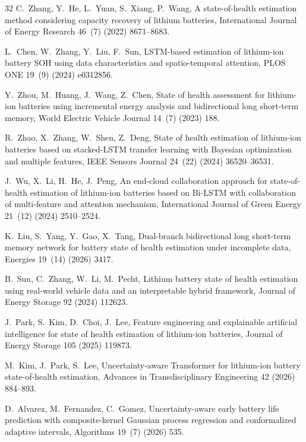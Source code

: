 \documentclass[a4paper,fleqn]{cas-sc}
\begin{document}
\begin{thebibliography}{32}
C.~Zhang, Y.~He, L.~Yuan, S.~Xiang, P.~Wang, A state-of-health estimation method considering capacity recovery of lithium batteries, International Journal of Energy Research 46~(7) (2022) 8671--8683.

L.~Chen, W.~Zhang, Y.~Liu, F.~Sun, LSTM-based estimation of lithium-ion battery SOH using data characteristics and spatio-temporal attention, PLOS ONE 19~(9) (2024) e0312856.

Y.~Zhou, M.~Huang, J.~Wang, Z.~Chen, State of health assessment for lithium-ion batteries using incremental energy analysis and bidirectional long short-term memory, World Electric Vehicle Journal 14~(7) (2023) 188.

R.~Zhao, X.~Zhang, W.~Shen, Z.~Deng, State of health estimation of lithium-ion batteries based on stacked-LSTM transfer learning with Bayesian optimization and multiple features, IEEE Sensors Journal 24~(22) (2024) 36520--36531.

J.~Wu, X.~Li, H.~He, J.~Peng, An end-cloud collaboration approach for state-of-health estimation of lithium-ion batteries based on Bi-LSTM with collaboration of multi-feature and attention mechanism, International Journal of Green Energy 21~(12) (2024) 2510--2524.

K.~Liu, S.~Yang, Y.~Gao, X.~Tang, Dual-branch bidirectional long short-term memory network for battery state of health estimation under incomplete data, Energies 19~(14) (2026) 3417.

B.~Sun, C.~Zhang, W.~Li, M.~Pecht, Lithium battery state of health estimation using real-world vehicle data and an interpretable hybrid framework, Journal of Energy Storage 92 (2024) 112623.

J.~Park, S.~Kim, D.~Choi, J.~Lee, Feature engineering and explainable artificial intelligence for state of health estimation of lithium-ion batteries, Journal of Energy Storage 105 (2025) 119873.

M.~Kim, J.~Park, S.~Lee, Uncertainty-aware Transformer for lithium-ion battery state-of-health estimation, Advances in Transdisciplinary Engineering 42 (2026) 884--893.

D.~Alvarez, M.~Fernandez, C.~Gomez, Uncertainty-aware early battery life prediction with composite-kernel Gaussian process regression and conformalized adaptive intervals, Algorithms 19~(7) (2026) 535.


\end{thebibliography}
\end{document}
